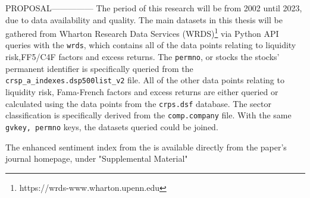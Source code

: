      









PROPOSAL---------------
The period of this research will be from 2002 until 2023, due to data availability and quality. The main datasets in this thesis will be gathered from Wharton Research Data Services (WRDS)\footnote{https://wrds-www.wharton.upenn.edu} via Python API queries with the \texttt{wrds}, which contains all of the data points relating to liquidity risk,FF5/C4F factors and excess returns. The \texttt{permno}, or stocks the stocks' permanent identifier is specifically queried from the \texttt{crsp\_a\_indexes.dsp500list\_v2}
file. All of the other data points relating to liquidity risk, Fama-French factors and excess returns are either queried or calculated using the data points from the \texttt{crps.dsf} database. The sector classification is specifically derived from the \texttt{comp.company} file. With the same \texttt{gvkey, permno} keys, the datasets queried could be joined.

The enhanced sentiment index from the  is available directly from the paper's journal homepage, under "Supplemental Material" 